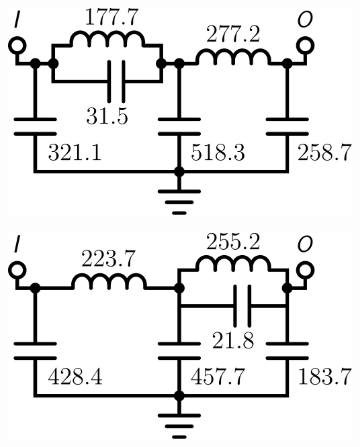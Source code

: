 
\begin{figure}[h!]
\centering

\begin{subfigure}[t]{0.25\textwidth}
\centering
\includegraphics[scale = 0.14]{../ch6/figures/lpf3_circuit1}
\caption{}
\end{subfigure}%
\begin{subfigure}[t]{0.25\textwidth}
\centering
\includegraphics[scale = 0.14]{../app2/figures/(2)}
\caption{}
\end{subfigure}%


\end{figure}
